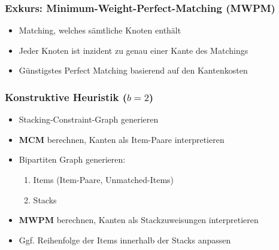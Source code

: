 \documentclass{beamer}
\begin{document}
\begin{frame}
\frametitle{Exkurs: Minimum-Weight-Perfect-Matching (\textsc{MWPM})}
\begin{itemize}
  \item Matching, welches sämtliche Knoten enthält
  \item Jeder Knoten ist inzident zu genau einer Kante des Matchings
  \item Günstigstes Perfect Matching basierend auf den Kantenkosten
\end{itemize}
\begin{figure}[H]
\centering
{}
\end{figure}
\end{frame}

\begin{frame}
\frametitle{Konstruktive Heuristik ($b = 2$)}

\begin{itemize}
  \item Stacking-Constraint-Graph generieren
  \item \textsc{\textbf{MCM}} berechnen, Kanten als Item-Paare interpretieren
  \item Bipartiten Graph generieren:
  \begin{enumerate}
    \item Items (Item-Paare, Unmatched-Items)
    \item Stacks
  \end{enumerate}
  \item \textsc{\textbf{MWPM}} berechnen, Kanten als Stackzuweisungen interpretieren
  \item Ggf. Reihenfolge der Items innerhalb der Stacks anpassen
\end{itemize}
\end{frame}
\end{document}
